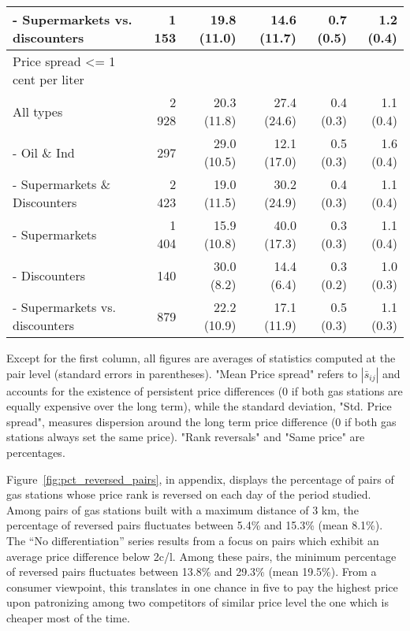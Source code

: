 \documentclass[english]{article}
\begin{document}
\begin{table}
\begin{threeparttable}
\begin{tabular}{lrrrrr}
    \hspace*{4mm} - Supermarkets vs. discounters & 1 153 & 19.8 (11.0) & 14.6 (11.7) & 0.7 (0.5) & 1.2 (0.4) \\
    \midrule
    Price spread <= 1 cent per liter &       &       &       &       &  \\
    All types & 2 928 & 20.3 (11.8) & 27.4 (24.6) & 0.4 (0.3) & 1.1 (0.4) \\
    - Oil \& Ind & 297   & 29.0 (10.5) & 12.1 (17.0) & 0.5 (0.3) & 1.6 (0.4) \\
    - Supermarkets \& Discounters & 2 423 & 19.0 (11.5) & 30.2 (24.9) & 0.4 (0.3) & 1.1 (0.4) \\
    \hspace*{4mm} - Supermarkets & 1 404 & 15.9 (10.8) & 40.0 (17.3) & 0.3 (0.3) & 1.1 (0.4) \\
    \hspace*{4mm} - Discounters & 140   & 30.0 \phantom{0}(8.2) & 14.4 \phantom{0}(6.4) & 0.3 (0.2) & 1.0 (0.3) \\
    \hspace*{4mm} - Supermarkets vs. discounters & 879   & 22.2 (10.9) & 17.1 (11.9) & 0.5 (0.3) & 1.1 (0.3) \\
    \bottomrule
    \bottomrule
\end{tabular}
\begin{tablenotes}
			\small
      \item Except for the first column, all figures are averages of statistics computed at the pair level (standard errors in parentheses). "Mean Price spread" refers to $|\bar{s}_{ij}|$ and accounts for the existence of persistent price differences (0 if both gas stations are equally expensive over the long term), while the standard deviation, "Std. Price spread", measures dispersion around the long term price difference (0 if both gas stations always set the same price). "Rank reversals" and "Same price" are percentages.
\end{tablenotes}
\end{threeparttable}
\end{table}

Figure~\ref{fig:pct_reversed_pairs}, in appendix, displays the percentage of pairs of gas stations whose price rank is reversed on each day of the period studied. Among pairs of gas stations built with a maximum distance of 3 km, the percentage of reversed pairs fluctuates between 5.4\% and 15.3\%  (mean 8.1\%). The ``No differentiation'' series results from a focus on pairs which exhibit an average price difference below 2c/l. Among these pairs, the minimum percentage of reversed pairs fluctuates between 13.8\% and 29.3\% (mean 19.5\%). From a consumer viewpoint, this translates in one chance in five to pay the highest price upon patronizing among two competitors of similar price level the one which is cheaper most of the time.
\end{document}
